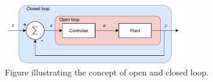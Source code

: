 \documentclass[../../main.tex]{subfiles}
\begin{document}




\begin{figure}[H]
    \centering
    \includegraphics[width=0.7\textwidth]{Sections/Miscellaneous/Images/Open_closed_Diagram.pdf}
    \caption{Figure illustrating the concept of open and closed loop. }
    \label{fig:Open_Close_loop}
\end{figure}
\end{document}
